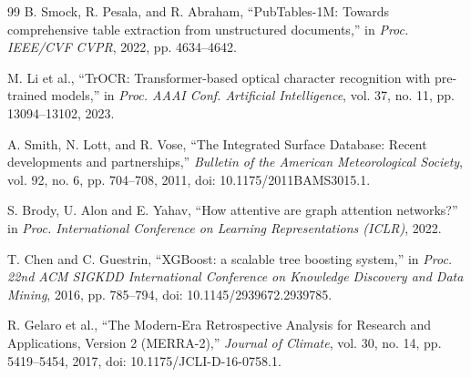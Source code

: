 \begin{thebibliography}{99}
 B. Smock, R. Pesala, and R. Abraham, ``PubTables-1M: Towards comprehensive table extraction from unstructured documents,'' in \textit{Proc. IEEE/CVF CVPR}, 2022, pp. 4634--4642.

 M. Li et al., ``TrOCR: Transformer-based optical character recognition with pre-trained models,'' in \textit{Proc. AAAI Conf. Artificial Intelligence}, vol. 37, no. 11, pp. 13094--13102, 2023.

 A. Smith, N. Lott, and R. Vose, ``The Integrated Surface Database: Recent developments and partnerships,'' \textit{Bulletin of the American Meteorological Society}, vol. 92, no. 6, pp. 704--708, 2011, doi: 10.1175/2011BAMS3015.1.

 S. Brody, U. Alon and E. Yahav, ``How attentive are graph attention networks?'' in \textit{Proc. International Conference on Learning Representations (ICLR)}, 2022.

 T. Chen and C. Guestrin, ``XGBoost: a scalable tree boosting system,'' in \textit{Proc. 22nd ACM SIGKDD International Conference on Knowledge Discovery and Data Mining}, 2016, pp. 785--794, doi: 10.1145/2939672.2939785.

 R. Gelaro et al., ``The Modern-Era Retrospective Analysis for Research and Applications, Version 2 (MERRA-2),'' \textit{Journal of Climate}, vol. 30, no. 14, pp. 5419--5454, 2017, doi: 10.1175/JCLI-D-16-0758.1.

\end{thebibliography}
